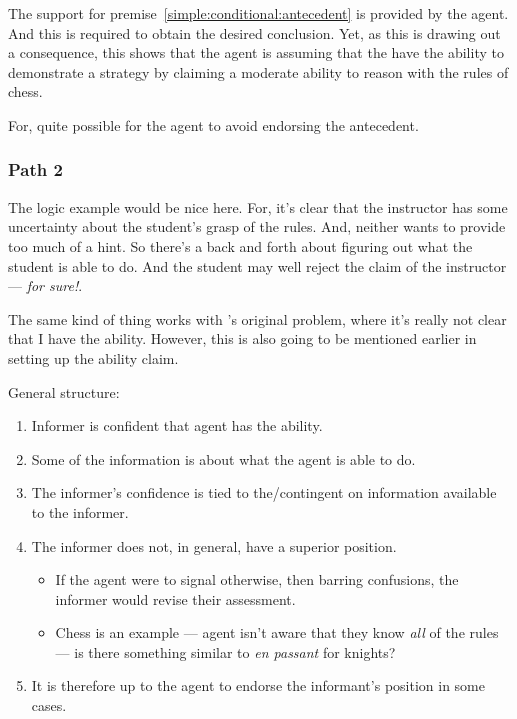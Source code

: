\documentclass[10pt]{article}
\begin{document}
The support for premise~\ref{simple:conditional:antecedent} is provided by the agent.
And this is required to obtain the desired conclusion.
Yet, as this is drawing out a consequence, this shows that the agent is assuming that the have the ability to demonstrate a strategy by claiming a moderate ability to reason with the rules of chess.

For, quite possible for the agent to avoid endorsing the antecedent.

\subsubsection{Path 2}
\label{sec:path-2}

\begin{note}
  The logic example would be nice here.
  For, it's clear that the instructor has some uncertainty about the student's grasp of the rules.
  And, neither wants to provide too much of a hint.
  So there's a back and forth about figuring out what the student is able to do.
  And the student may well reject the claim of the instructor --- \emph{for sure!}.
\end{note}

\begin{note}
  The same kind of thing works with \cite{Emms:2000aa}'s original problem, where it's really not clear that I have the ability.
  However, this is also going to be mentioned earlier in setting up the ability claim.
\end{note}

\begin{note}
  General structure:
  \begin{enumerate}
  \item Informer is confident that agent has the ability.
  \item Some of the information is about what the agent is able to do.
  \item The informer's confidence is tied to the/contingent on information available to the informer.
  \item The informer does not, in general, have a superior position.
    \begin{itemize}
    \item If the agent were to signal otherwise, then barring confusions, the informer would revise their assessment.
    \item Chess is an example --- agent isn't aware that they know \emph{all} of the rules --- is there something similar to \emph{en passant} for knights?
    \end{itemize}
  \item It is therefore up to the agent to endorse the informant's position in some cases.
  \end{enumerate}
\end{note}
\end{document}
